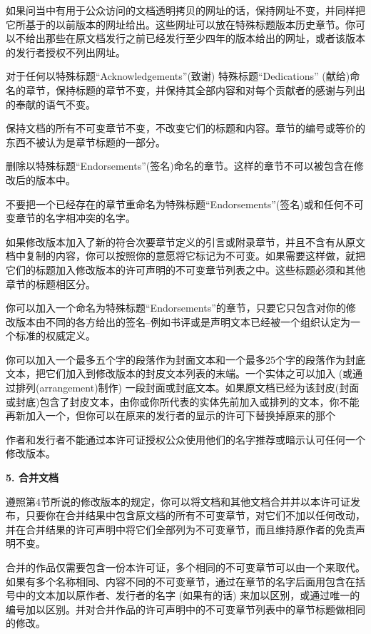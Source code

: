 如果问当中有用于公众访问的文档透明拷贝的网址的话，保持网址不变，并同样把它所基于的以前版本的网址给出。这些网址可以放在特殊标题版本历史章节。你可以不给出那些在原文档发行之前已经发行至少四年的版本给出的网址，或者该版本的发行者授权不列出网址。 

对于任何以特殊标题``Acknowledgements''(致谢) 特殊标题``Dedications'' (献给)命名的章节，保持标题的章节不变，并保持其全部内容和对每个贡献者的感谢与列出的奉献的语气不变。 

保持文档的所有不可变章节不变，不改变它们的标题和内容。章节的编号或等价的东西不被认为是章节标题的一部分。 

删除以特殊标题``Endorsements''(签名)命名的章节。这样的章节不可以被包含在修改后的版本中。 

不要把一个已经存在的章节重命名为特殊标题``Endorsements''(签名)或和任何不可变章节的名字相冲突的名字。 

如果修改版本加入了新的符合次要章节定义的引言或附录章节，并且不含有从原文档中复制的内容，你可以按照你的意愿将它标记为不可变。如果需要这样做，就把它们的标题加入修改版本的许可声明的不可变章节列表之中。这些标题必须和其他章节的标题相区分。

你可以加入一个命名为特殊标题``Endorsements''的章节，只要它只包含对你的修改版本由不同的各方给出的签名--例如书评或是声明文本已经被一个组织认定为一个标准的权威定义。

你可以加入一个最多五个字的段落作为封面文本和一个最多25个字的段落作为封底文本，把它们加入到修改版本的封皮文本列表的末端。一个实体之可以加入 (或通过排列(arrangement)制作) 一段封面或封底文本。如果原文档已经为该封皮(封面或封底)包含了封皮文本，由你或你所代表的实体先前加入或排列的文本，你不能再新加入一个，但你可以在原来的发行者的显示的许可下替换掉原来的那个

作者和发行者不能通过本许可证授权公众使用他们的名字推荐或暗示认可任何一个修改版本。

\begin{center}
{\Large\bf 5. 合并文档\par}
\end{center}


遵照第4节所说的修改版本的规定，你可以将文档和其他文档合并并以本许可证发布，只要你在合并结果中包含原文档的所有不可变章节，对它们不加以任何改动，并在合并结果的许可声明中将它们全部列为不可变章节，而且维持原作者的免责声明不变。

合并的作品仅需要包含一份本许可证，多个相同的不可变章节可以由一个来取代。如果有多个名称相同、内容不同的不可变章节，通过在章节的名字后面用包含在括号中的文本加以原作者、发行者的名字 (如果有的话) 来加以区别，或通过唯一的编号加以区别。并对合并作品的许可声明中的不可变章节列表中的章节标题做相同的修改。

